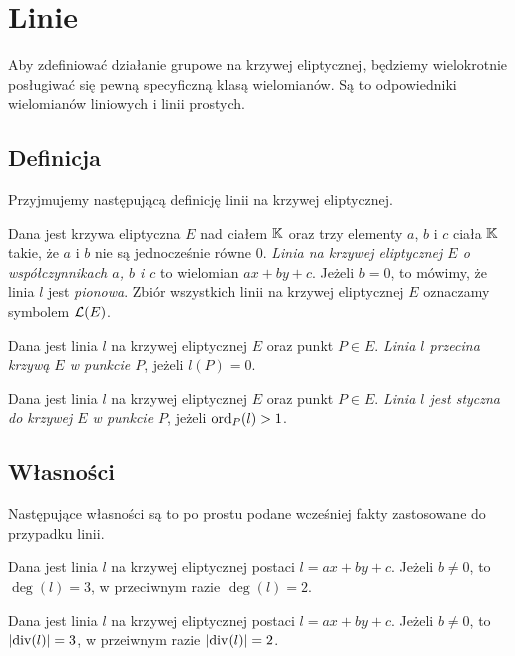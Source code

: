 \section{Linie}

Aby zdefiniować działanie grupowe na krzywej eliptycznej,
będziemy wielokrotnie posługiwać się
pewną specyficzną klasą wielomianów.
Są to odpowiedniki wielomianów liniowych
i linii prostych.

\subsection*{Definicja}

Przyjmujemy następującą definicję linii na krzywej eliptycznej.

\begin{definition}
Dana jest krzywa eliptyczna $E$ nad ciałem $\mathbb{K}$
oraz trzy elementy $a$, $b$ i $c$ ciała $\mathbb{K}$ takie,
że $a$ i $b$ nie są jednocześnie równe $0$.
\emph{Linia na krzywej eliptycznej $E$ o współczynnikach $a$, $b$ i $c$}
to wielomian $ax + by + c$.
Jeżeli $b = 0$, to mówimy, że linia $l$ jest \emph{pionowa}.
Zbiór wszystkich linii na krzywej eliptycznej $E$
oznaczamy symbolem $\mathcal{L}(E)$.
\end{definition}

\begin{definition}
Dana jest linia $l$ na krzywej eliptycznej $E$
oraz punkt $P \in E$.
\emph{Linia $l$ przecina krzywą $E$ w punkcie $P$},
jeżeli $l(P) = 0$.
\end{definition}

\begin{definition}
Dana jest linia $l$ na krzywej eliptycznej $E$
oraz punkt $P \in E$.
\emph{Linia $l$ jest styczna do krzywej $E$ w punkcie $P$},
jeżeli $\operatorname{ord}_P(l) > 1$.
\end{definition}

\subsection*{Własności}

Następujące własności są to po prostu podane wcześniej fakty
zastosowane do przypadku linii.

\begin{fact}\label{line_deg_fact}
Dana jest linia $l$ na krzywej eliptycznej postaci $l = ax + by + c$.
Jeżeli $b \neq 0$, to $\deg(l) = 3$,
w przeciwnym razie $\deg(l) = 2$.
\end{fact}

\begin{fact}\label{line_divisor_norm_fact}
Dana jest linia $l$ na krzywej eliptycznej postaci $l = ax + by + c$.
Jeżeli $b \neq 0$, to $\lvert\operatorname{div}(l)\rvert = 3$,
w przeiwnym razie $\lvert\operatorname{div}(l)\rvert = 2$.
\end{fact}

